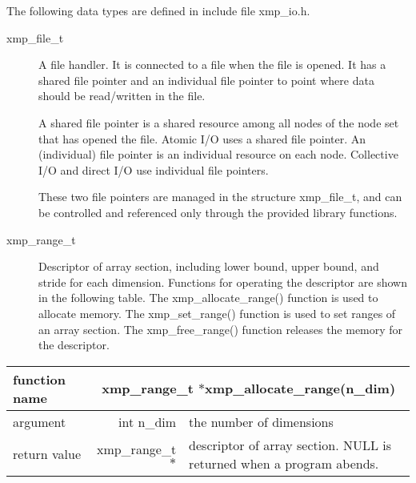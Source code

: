    The following data types are defined in include file xmp\_io.h.
   \begin{description}
    \item[xmp\_file\_t] A file handler.
	       It is connected to a file when the file is opened.
	       It has a shared file pointer and an individual file pointer
	       to point where data should be read/written in the file.

	       A shared file pointer is a shared resource among all nodes of the node set
             that has opened the file. Atomic I/O uses a shared file pointer.
	       An (individual) file pointer is an individual resource on each node. 
	       Collective I/O and direct I/O use individual file pointers.
	       
	       These two file pointers are managed in the structure xmp\_file\_t,
	       and can be controlled and referenced only through
	       the provided library functions.

	       

\item[xmp\_range\_t] Descriptor of array section, including
      lower bound, upper bound, and stride for each dimension.
      Functions for operating the descriptor are shown in the following table.
      The xmp\_allocate\_range() function is used to allocate memory.
      The xmp\_set\_range() function is used to set ranges of an array section.
      The xmp\_free\_range() function releases the memory for the descriptor.
   \end{description}

   \begin{table}[h]
    \begin{center}
      \begin{tabular}{|l|r|p{90mm}|}
      \hline
      {\bf function name}  & \multicolumn{2}{c|}{\bf xmp\_range\_t $*$xmp\_allocate\_range(n\_dim)}  \\ \hline \hline
      argument & int n\_dim & the number of dimensions \\ \hline
      return value & xmp\_range\_t$*$ & descriptor of array section. NULL is returned
	      when a program abends. \\ \hline
      \end{tabular}
     \end{center}
   \end{table}

